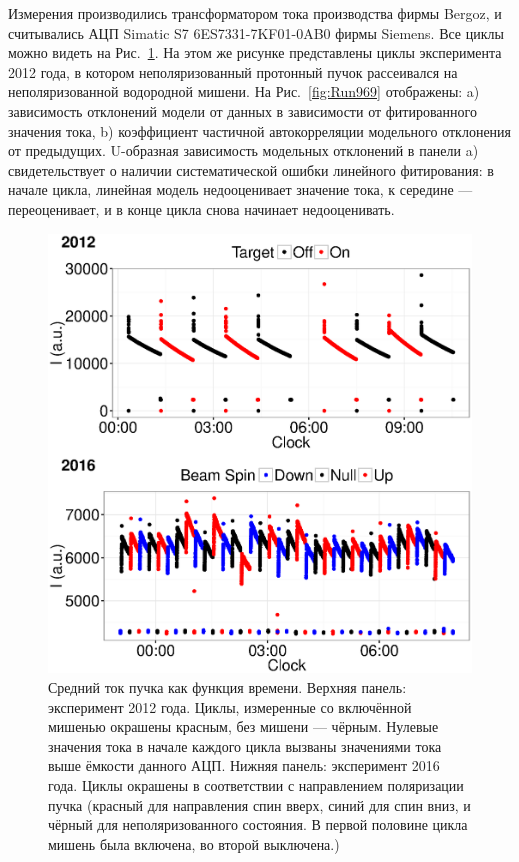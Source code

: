\documentclass{article}
\begin{document}
	Измерения производились трансформатором тока производства фирмы Bergoz, и считывались АЦП Simatic S7 6ES7331-7KF01-0AB0 фирмы Siemens. Все циклы можно видеть на Рис.~\ref{fig:Cycles}. На этом же рисунке представлены циклы эксперимента 2012 года, в котором неполяризованный протонный пучок рассеивался на неполяризованной водородной мишени. На Рис.~\ref{fig:Run969} отображены: a) зависимость отклонений модели от данных в зависимости от фитированного значения тока, b) коэффициент частичной автокорреляции модельного отклонения от предыдущих. U-образная зависимость модельных отклонений в панели a) свидетельствует о наличии систематической ошибки линейного фитирования: в начале цикла, линейная модель недооценивает значение тока, к середине --- переоценивает, и в конце цикла снова начинает недооценивать. 
	
	\begin{figure}[h]
		\centering
		\includegraphics[scale=.8]{img/Cycles_12--16.eps}
		\caption{Средний ток пучка как функция времени. 
			Верхняя панель: эксперимент 2012 года. Циклы, измеренные со включённой мишенью окрашены красным, без мишени --- чёрным. Нулевые значения тока в начале каждого цикла вызваны значениями тока выше ёмкости данного АЦП.
			Нижняя панель: эксперимент 2016 года. Циклы окрашены в соответствии с направлением поляризации пучка (красный для направления спин вверх, синий для спин вниз, и чёрный для неполяризованного состояния. В первой половине цикла мишень была включена, во второй выключена.\label{fig:Cycles})}
	\end{figure}
	
\end{document}
